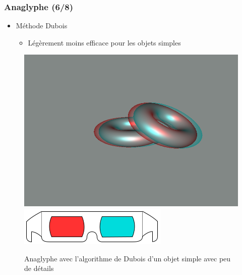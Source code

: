 \documentclass{beamer}
\begin{document}
%
% 
\begin{frame}
\frametitle{Anaglyphe (6/8)}
\begin{itemize}[label=$\bullet$]
\item Méthode Dubois \cite{algoDubois}
	\begin{itemize}[label=$\circ$]
	\item Légèrement moins efficace pour les objets simples 
	\end{itemize}
\end{itemize}
\begin{figure}
\centering
\includegraphics[scale=0.35]{donuts_dubois.png}
\includegraphics[scale=0.2]{lunettes.png}
\caption{Anaglyphe avec l'algorithme de Dubois d'un objet simple avec peu de détails}
\end{figure}
\end{frame}
% 
\end{document}
